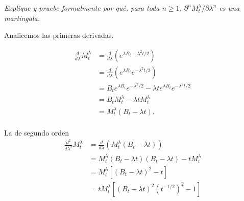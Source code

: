 \emph{
    Explique y pruebe formalmente por qu\'e, para toda 
    $n\geq 1$, $\partial^n M^\lambda_t/\partial \lambda^n$ es una martingala.\pn
}

\afterstatement\pn

Analicemos las primeras derivadas.

\begin{align}
    \frac{d}{d\lambda}  M_t^\lambda &=  \frac{d}{d\lambda} \left( e^{\lambda B_t - \lambda^2 t/2} \right)                       \\
                                    &=  \frac{d}{d\lambda} \left( e^{\lambda B_t} e^{- \lambda^2 t/2} \right)                   \\
                                    &=  B_t e^{\lambda B_t} e^{- \lambda^2/2}  - \lambda t e^{\lambda B_t} e^{- \lambda^2 t/2}  \\
                                    &=  B_t M_t^\lambda - \lambda t M_t^\lambda                                                 \\
                                    &=  M_t^\lambda (B_t - \lambda t).                                                          \\
\end{align}

La de segundo orden
\begin{align}
    \frac{d^2}{d\lambda^2}  M_t^\lambda     &=  \frac{d}{d\lambda} \left( M_t^\lambda (B_t - \lambda t) \right)                     \\
                                            &=  M_t^\lambda (B_t - \lambda t) (B_t - \lambda t) -  t M_t^\lambda                    \\ 
                                            &=  M_t^\lambda \left[ (B_t - \lambda t)^2 -  t \right]                                 \\    
                                            &=  t M_t^\lambda \left[ (B_t - \lambda t)^2 (t^{-1/2})^2 -  1 \right]                       
\end{align}\pn

